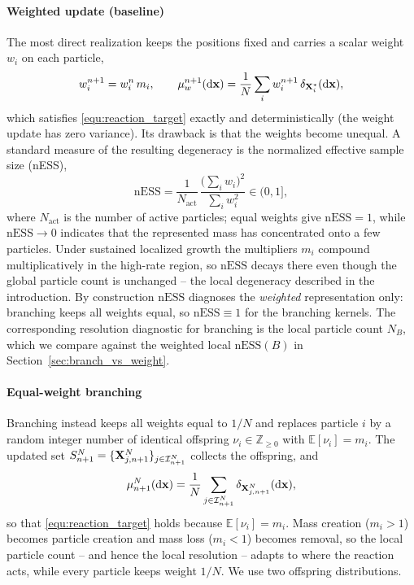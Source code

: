 \documentclass[a4paper,fleqn]{cas-sc}
\theoremstyle{definition}
\theoremstyle{remark}
\begin{document}
\paragraph{Weighted update (baseline)}
The most direct realization keeps the positions fixed and carries a scalar weight $w_i$ on each particle,
\begin{equation}\label{equ:weighted}
w_i^{n+1} = w_i^{n}\,m_i,
\qquad
\mu_w^{n+1}(\mathrm{d}\mathbf{x}) = \frac1N\sum_i w_i^{n+1}\,\delta_{\mathbf{X}_i^\ast}(\mathrm{d}\mathbf{x}),
\end{equation}
which satisfies \eqref{equ:reaction_target} exactly and deterministically (the weight update has zero variance).
Its drawback is that the weights become unequal. A standard measure of the resulting degeneracy is the
normalized effective sample size (nESS),
\begin{equation}\label{equ:ESS}
\mathrm{nESS} = \frac{1}{N_{\mathrm{act}}}\,\frac{\big(\sum_i w_i\big)^2}{\sum_i w_i^2}\in(0,1],
\end{equation}
where $N_{\mathrm{act}}$ is the number of active particles; equal weights give $\mathrm{nESS}=1$, while
$\mathrm{nESS}\to0$ indicates that the represented mass has concentrated onto a few particles. Under sustained
localized growth the multipliers $m_i$ compound multiplicatively in the high-rate region, so $\mathrm{nESS}$
decays there even though the global particle count is unchanged -- the local degeneracy described in the
introduction. By construction $\mathrm{nESS}$ diagnoses the \emph{weighted} representation only: branching keeps
all weights equal, so $\mathrm{nESS}\equiv1$ for the branching kernels. The corresponding resolution diagnostic
for branching is the local particle count $N_B$, which we compare against the weighted local $\mathrm{nESS}(B)$
in Section~\ref{sec:branch_vs_weight}.

\paragraph{Equal-weight branching}
Branching instead keeps all weights equal to $1/N$ and replaces particle $i$ by a random integer number of
identical offspring $\nu_i\in\mathbb Z_{\ge0}$ with $\mathbb E[\nu_i]=m_i$. The updated set
$S_{n+1}^N=\{\mathbf{X}_{j,n+1}^N\}_{j\in\mathcal I_{n+1}^N}$ collects the offspring, and
\begin{equation}
\mu_{n+1}^{N}(\mathrm{d}\mathbf{x})=\frac1N\sum_{j\in\mathcal I_{n+1}^N}\delta_{\mathbf{X}_{j,n+1}^N}(\mathrm{d}\mathbf{x}),
\end{equation}
so that \eqref{equ:reaction_target} holds because $\mathbb E[\nu_i]=m_i$. Mass creation ($m_i>1$) becomes
particle creation and mass loss ($m_i<1$) becomes removal, so the local particle count -- and hence the local
resolution -- adapts to where the reaction acts, while every particle keeps weight $1/N$. We use two offspring
distributions.
\end{document}

